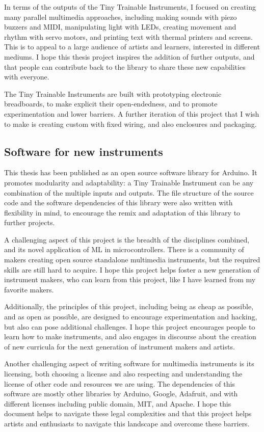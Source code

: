 In terms of the outputs of the Tiny Trainable Instruments, I focused on creating many parallel multimedia approaches, including making sounds with piezo buzzers and MIDI, manipulating light with LEDs, creating movement and rhythm with servo motors, and printing text with thermal printers and screens. This is to appeal to a large audience of artists and learners, interested in different mediums. I hope this thesis project inspires the addition of further outputs, and that people can contribute back to the library to share these new capabilities with everyone.

The Tiny Trainable Instruments are built with prototyping electronic breadboards, to make explicit their open-endedness, and to promote experimentation and lower barriers. A further iteration of this project that I wish to make is creating custom  with fixed wiring, and also enclosures and packaging.

\subsection{Software for new instruments}

This thesis has been published as an open source software library for Arduino. It promotes modularity and adaptability: a Tiny Trainable Instrument can be any combination of the multiple inputs and outputs. The file structure of the source code and the software dependencies of this library were also written with flexibility in mind, to encourage the remix and adaptation of this library to further projects.

A challenging aspect of this project is the breadth of the disciplines combined, and its novel application of \acrshort{ML} in microcontrollers. There is a community of makers creating open source standalone multimedia instruments, but the required skills are still hard to acquire. I hope this project helps foster a new generation of instrument makers, who can learn from this project, like I have learned from my favorite makers.

Additionally, the principles of this project, including being as cheap as possible, and as open as possible, are designed to encourage experimentation and hacking, but also can pose additional challenges. I hope this project encourages people to learn how to make instruments, and also engages in discourse about the creation of new curricula for the next generation of instrument makers and artists.

Another challenging aspect of writing software for multimedia instruments is its licensing, both choosing a license and also respecting and understanding the license of other code and resources we are using. The dependencies of this software are mostly other libraries by Arduino, Google, Adafruit, and with different licenses including public domain, MIT, and Apache. I hope this document helps to navigate these legal complexities and that this project helps artists and enthusiasts to navigate this landscape and overcome these barriers.

